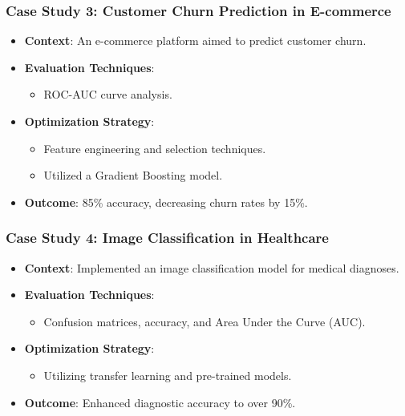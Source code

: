 \documentclass[aspectratio=169]{beamer}
\begin{document}
\begin{frame}[fragile]
    \frametitle{Case Study 3: Customer Churn Prediction in E-commerce}
    \begin{itemize}
        \item \textbf{Context}: An e-commerce platform aimed to predict customer churn.
        \item \textbf{Evaluation Techniques}: 
            \begin{itemize}
                \item ROC-AUC curve analysis.
            \end{itemize}
        \item \textbf{Optimization Strategy}: 
            \begin{itemize}
                \item Feature engineering and selection techniques.
                \item Utilized a Gradient Boosting model.
            \end{itemize}
        \item \textbf{Outcome}: 85\% accuracy, decreasing churn rates by 15\%.
    \end{itemize}
\end{frame}

\begin{frame}[fragile]
    \frametitle{Case Study 4: Image Classification in Healthcare}
    \begin{itemize}
        \item \textbf{Context}: Implemented an image classification model for medical diagnoses.
        \item \textbf{Evaluation Techniques}: 
            \begin{itemize}
                \item Confusion matrices, accuracy, and Area Under the Curve (AUC).
            \end{itemize}
        \item \textbf{Optimization Strategy}: 
            \begin{itemize}
                \item Utilizing transfer learning and pre-trained models.
            \end{itemize}
        \item \textbf{Outcome}: Enhanced diagnostic accuracy to over 90\%.
    \end{itemize}
\end{frame}
\end{document}
